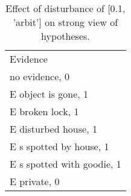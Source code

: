 \begin{table}\begin{tabular}{l}\toprule\multirow{2}{*}{Evidence} \\\\\midrule
no evidence, 0 & \\E object is gone, 1 & \\E broken lock, 1 & \\E disturbed house, 1 & \\E s spotted by house, 1 & \\E s spotted with goodie, 1 & \\E private, 0 & \\\bottomrule\end{tabular}\caption{Effect of disturbance of [0.1, 'arbit'] on strong view of hypotheses.}\end{table}